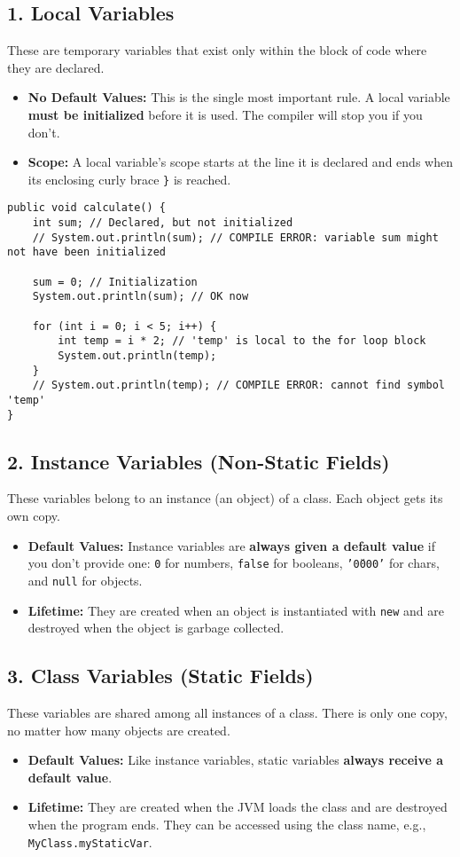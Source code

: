 \documentclass[12pt]{article}
\begin{document}
\begin{enumerate}[label=(\arabic*)]
\subsection*{1. Local Variables}
These are temporary variables that exist only within the block of code where they are declared.
\begin{itemize}
\item \textbf{No Default Values:} This is the single most important rule. A local variable \textbf{must be initialized} before it is used. The compiler will stop you if you don't.
\item \textbf{Scope:} A local variable's scope starts at the line it is declared and ends when its enclosing curly brace \texttt{\}} is reached. 
\end{itemize}
\begin{verbatim}
public void calculate() {
    int sum; // Declared, but not initialized
    // System.out.println(sum); // COMPILE ERROR: variable sum might not have been initialized
    
    sum = 0; // Initialization
    System.out.println(sum); // OK now
    
    for (int i = 0; i < 5; i++) {
        int temp = i * 2; // 'temp' is local to the for loop block
        System.out.println(temp);
    }
    // System.out.println(temp); // COMPILE ERROR: cannot find symbol 'temp'
}
\end{verbatim}

\subsection*{2. Instance Variables (Non-Static Fields)}
These variables belong to an instance (an object) of a class. Each object gets its own copy.
\begin{itemize}
\item \textbf{Default Values:} Instance variables are \textbf{always given a default value} if you don't provide one: \texttt{0} for numbers, \texttt{false} for booleans, \texttt{'\u0000'} for chars, and \texttt{null} for objects.
\item \textbf{Lifetime:} They are created when an object is instantiated with \texttt{new} and are destroyed when the object is garbage collected.
\end{itemize}

\subsection*{3. Class Variables (Static Fields)}
These variables are shared among all instances of a class. There is only one copy, no matter how many objects are created.
\begin{itemize}
\item \textbf{Default Values:} Like instance variables, static variables \textbf{always receive a default value}.
\item \textbf{Lifetime:} They are created when the JVM loads the class and are destroyed when the program ends. They can be accessed using the class name, e.g., \texttt{MyClass.myStaticVar}.
\end{itemize}


\end{enumerate}
\end{document}
